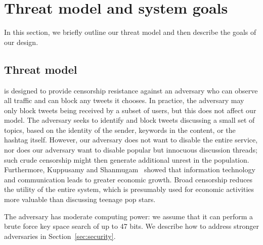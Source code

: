 \section{Threat model and system goals}

In this section, we briefly outline our threat model and then describe
the goals of our design.

\subsection{Threat model} \label{sec:threat}
\hoot is designed to provide censorship resistance against an adversary
who can observe all \hoot traffic and can block any tweets it chooses. In
practice, the adversary may only block tweets being received by a subset of users,
but this does not affect our model. The adversary seeks to identify and
block tweets discussing a small set of topics, based on the identity of
the sender, keywords in the content, or the hashtag itself. However,
our adversary does not want to disable the entire service, nor does
our adversary want to disable popular but innocuous discussion
threads; such crude censorship might
then generate additional unrest in the population. 
Furthermore, Kuppusamy and Shanmugam~\cite{ict-economy} showed that information technology 
and communication leads to greater economic growth. Broad censorship 
reduces the utility of the entire system, which is presumably used for
economic activities more valuable than discussing teenage pop stars.


The adversary has moderate computing power: we assume that it can
perform a brute force key space search of up to 47 bits. We describe how
to address stronger adversaries in Section~\ref{sec:security}.

